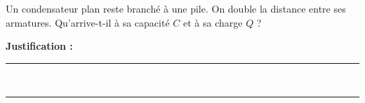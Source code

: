 Un condensateur plan reste branché à une pile. On double la distance entre ses armatures. Qu'arrive-t-il à sa capacité $C$ et à sa charge $Q$ ?

\choices

\noindent\textbf{Justification :} \hrulefill \\[2.5ex]
\rule{\linewidth}{0.4pt} \\[2.5ex]
\rule{\linewidth}{0.4pt}
\vfill
